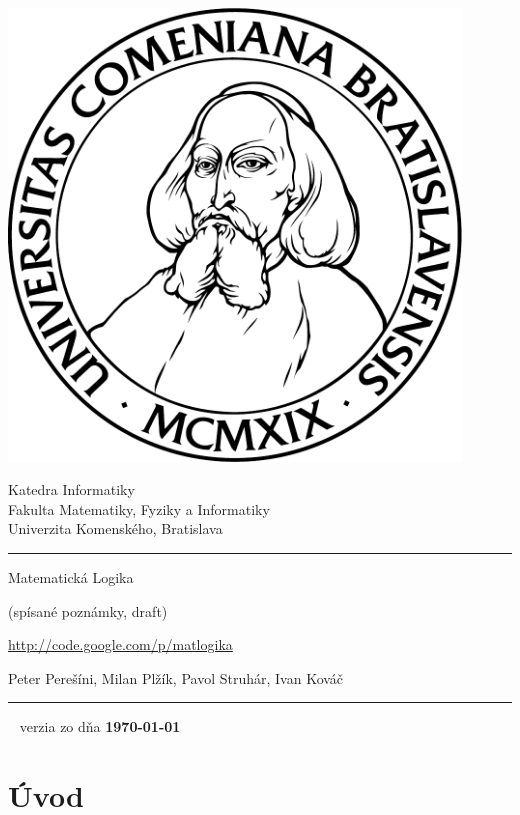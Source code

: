 \documentclass[a4paper]{report}
\begin{document}
\thispagestyle{empty}
\begin{minipage}{0.25\textwidth}
\includegraphics[width=0.9\textwidth]{img/komlogo-new}
\end{minipage}
\begin{minipage}{0.69\textwidth}
\begin{center}
\sc Katedra Informatiky \\
Fakulta Matematiky, Fyziky a Informatiky \\
Univerzita Komenského, Bratislava
\end{center}
\end{minipage}

\vfill
\begin{center}
\begin{minipage}{0.8\textwidth}
\hrule
\bigskip\bigskip
\centerline{\LARGE\sc Matematická Logika}
\smallskip
\centerline{(spísané poznámky, draft)}
\bigskip
\centerline{\url{http://code.google.com/p/matlogika}}
\bigskip
\centerline{\large\sc Peter Perešíni, Milan Plžík, Pavol Struhár, Ivan Kováč}
\bigskip\bigskip
\hrule
\end{minipage}
\end{center}
\vfill
{~}
\hfill verzia zo dňa {\bf\today} 
\eject %

\section*{Úvod}
\end{document}
